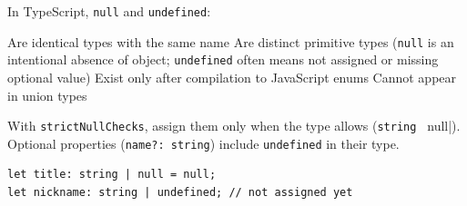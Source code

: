 \question[4]
In TypeScript, \lstinline[style=tsinline]|null| and \lstinline[style=tsinline]|undefined|:
\begin{choices}
  \choice Are identical types with the same name
  \CorrectChoice Are distinct primitive types (\lstinline[style=tsinline]|null| is an intentional absence of object; \lstinline[style=tsinline]|undefined| often means not assigned or missing optional value)
  \choice Exist only after compilation to JavaScript enums
  \choice Cannot appear in union types
\end{choices}
\begin{solution}
  With \texttt{strictNullChecks}, assign them only when the type allows (\lstinline[style=tsinline]|string | null|). Optional properties (\lstinline[style=tsinline]|name?: string|) include \lstinline[style=tsinline]|undefined| in their type.
\begin{lstlisting}[style=ts]
let title: string | null = null;
let nickname: string | undefined; // not assigned yet
\end{lstlisting}
\end{solution}




\newpage




